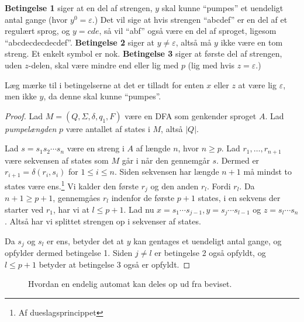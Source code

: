 \textbf{Betingelse 1} siger at en del af strengen, $y$ skal kunne ``pumpes'' et uendeligt antal gange (hvor $y^{0} = \varepsilon$.) Det vil sige at hvis strengen ``abcdef'' er en del af et regulært sprog, og $y = cde$, så vil ``abf'' også være en del af sproget, ligesom ``abcdecdecdecdef''.
\textbf{Betingelse 2} siger at $y \neq \varepsilon$, altså må $y$ ikke være en tom streng. Et enkelt symbol er nok.
\textbf{Betingelse 3} siger at første del af strengen, uden $z$-delen, skal være mindre end eller lig med $p$ (lig med hvis $z = \varepsilon$.)

Læg mærke til i betingelserne at det er tilladt for enten $x$ eller $z$ at være lig $\varepsilon$, men ikke $y$, da denne skal kunne ``pumpes''.

\begin{proof}
  Lad $M = (Q, \Sigma, \delta, q_{1}, F)$ være en DFA som genkender sproget $A$. Lad \textit{pumpelængden} $p$ være antallet af states i $M$, altså $|Q|$.

  Lad $s = s_{1}s_{2} \cdots s_{n}$ være en streng i $A$ af længde $n$, hvor $n \geq p$. Lad $r_{1}, \ldots, r_{n+1}$ være sekvensen af states som $M$ går i når den gennemgår $s$. Dermed er $r_{i+1} = \delta(r_i, s_{i})$ for $1 \leq i \leq n$. Siden sekvensen har længde $n+1$ må mindst to states være ens.\footnote{Af dueslagsprincippet} Vi kalder den første $r_{j}$ og den anden $r_{l}$. Fordi $r_{l}$. Da $n+1 \geq p+1$, gennemgåes $r_{l}$ indenfor de første $p+1$ states, i en sekvens der starter ved $r_{1}$, har vi at $l \leq p+1$. Lad nu $x = s_{1} \cdots s_{j-1}, y = s_{j} \cdots s_{l-1}$ og $z = s_{l} \cdots s_{n}$. Altså har vi splittet strengen op i sekvenser af states.

  Da $s_{j}$ og $s_{l}$ er ens, betyder det at $y$ kan gentages et uendeligt antal gange, og opfylder dermed betingelse 1. Siden $j \neq l$ er betingelse 2 også opfyldt, og $l \leq p+1$ betyder at betingelse 3 også er opfyldt.
\end{proof}


\begin{figure}[ht]
  \centering
  \caption{\label{fig:pumpelemma} Hvordan en endelig automat kan deles op ud fra beviset.}
\end{figure}


